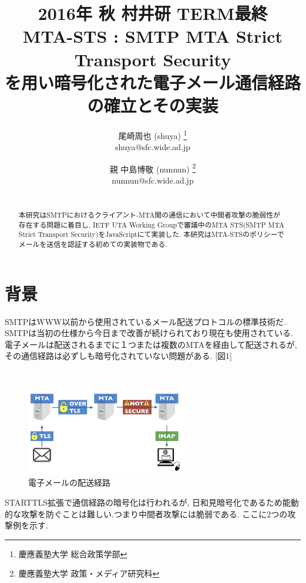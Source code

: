 \documentclass[a4j, 10pt, uplatex]{jsarticle}
\begin{document}

\title{2016年 秋 村井研 TERM最終\\
MTA-STS : SMTP MTA Strict Transport Security
\\を用い暗号化された電子メール通信経路の確立とその実装}

\author{
    尾崎周也 (shuya) \thanks{慶應義塾大学 総合政策学部}
    \\shuya@sfc.wide.ad.jp
    \and
    親 中島博敬 (nunnun) \thanks{慶應義塾大学 政策・メディア研究科}
    \\nunnun@sfc.wide.ad.jp
}


\begin{abstract}
\\
本研究はSMTPにおけるクライアント-MTA間の通信において中間者攻撃の脆弱性が存在する問題に着目し, IETF UTA Working Groupで審議中のMTA STS(SMTP MTA Strict Transport Security)\cite{draft}をJavaScriptにて実装した. 本研究はMTA-STSのポリシーでメールを送信を認証する初めての実装物である.
\end{abstract}

\maketitle
\thispagestyle{empty}

\section{背景}

SMTPはWWW以前から使用されているメール配送プロトコルの標準技術だ. SMTPは当初の仕様から今日まで改善が続けられており現在も使用されている. 電子メールは配送されるまでに１つまたは複数のMTAを経由して配送されるが, その通信経路は必ずしも暗号化されていない問題がある. [図1]
\begin{figure}[htbp]
　\begin{center}
      \includegraphics[width=7cm]{figure1.png}
      \caption{電子メールの配送経路}
    \end{center}
\end{figure}

STARTTLS拡張で通信経路の暗号化は行われるが, 日和見暗号化であるため能動的な攻撃を防ぐことは難しい.つまり中間者攻撃には脆弱である. ここに2つの攻撃例を示す.
\end{document}
